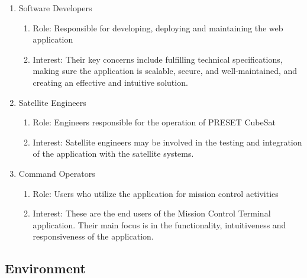 \documentclass{article}
\begin{document}
\begin{enumerate}
\begin{enumerate}
    \end{enumerate}
    \item Software Developers
    \begin{enumerate}
        \item Role: Responsible for developing, deploying and maintaining the web application
        \item Interest: Their key concerns include fulfilling technical specifications, making sure the application is scalable, secure, and well-maintained, and creating an effective and intuitive solution. 
    \end{enumerate}
    \item Satellite Engineers
    \begin{enumerate}
        \item Role: Engineers responsible for the operation of PRESET CubeSat
        \item Interest: Satellite engineers may be involved in the testing and integration of the application with the satellite systems.
    \end{enumerate}
    \item Command Operators
    \begin{enumerate}
        \item Role: Users who utilize the application for mission control activities
        \item Interest: These are the end users of the Mission Control Terminal application. Their main focus is in the functionality, intuitiveness and responsiveness of the application.
    \end{enumerate}
\end{enumerate}


\subsection{Environment}

\end{document}
